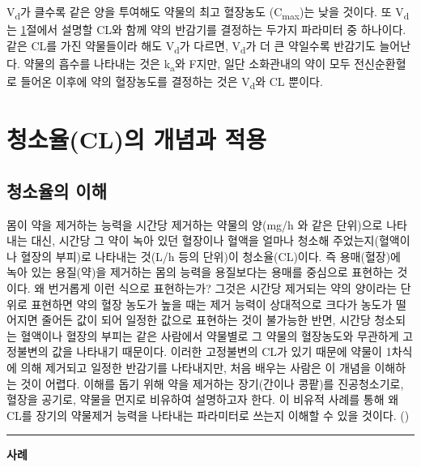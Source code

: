 \documentclass[
  11pt,
  krantz2, a4paper, twoside]{krantz}
\theoremstyle{definition}
\theoremstyle{definition}
\theoremstyle{definition}
\theoremstyle{definition}
\theoremstyle{remark}
\begin{document}
V\textsubscript{d}가 클수록 같은 양을 투여해도 약물의 최고 혈장농도 (C\textsubscript{max})는 낮을 것이다.
또 V\textsubscript{d}는 \ref{clearance-concept}절에서 설명할 CL와 함께 약의 반감기를 결정하는 두가지 파라미터 중 하나이다. 
같은 CL를 가진 약물들이라 해도 V\textsubscript{d}가 다르면, V\textsubscript{d}가 더 큰 약일수록 반감기도 늘어난다. 
약물의 흡수를 나타내는 것은 k\textsubscript{a}와 F지만, 일단 소화관내의 약이 모두 전신순환혈로 들어온 이후에 약의 혈장농도를 결정하는 것은 V\textsubscript{d}와 CL 뿐이다.

\section{청소율(CL)의 개념과 적용}\label{clearance-concept}

\subsection{\texorpdfstring{청소율의 이해}{청소율의 이해}}\label{uxccaduxc18cuxc728uxc758-uxc774uxd574}

몸이 약을 제거하는 능력을 시간당 제거하는 약물의 양(mg/h 와 같은 단위)으로 나타내는 대신, 시간당 그 약이 녹아 있던 혈장이나 혈액을 얼마나 청소해 주었는지(혈액이나 혈장의 부피)로 나타내는 것(L/h 등의 단위)이 청소율(CL)이다. 
즉 용매(혈장)에 녹아 있는 용질(약)을 제거하는 몸의 능력을 용질보다는 용매를 중심으로 표현하는 것이다.
왜 번거롭게 이런 식으로 표현하는가?
그것은 시간당 제거되는 약의 양이라는 단위로 표현하면 약의 혈장 농도가 높을 때는 제거 능력이 상대적으로 크다가 농도가 떨어지면 줄어든 값이 되어 일정한 값으로 표현하는 것이 불가능한 반면, 시간당 청소되는 혈액이나 혈장의 부피는 같은 사람에서 약물별로 그 약물의 혈장농도와 무관하게 고정불변의 값을 나타내기 때문이다.
이러한 고정불변의 CL가 있기 때문에 약물이 1차식에 의해 제거되고 일정한 반감기를 나타내지만, 처음 배우는 사람은 이 개념을 이해하는 것이 어렵다. 
이해를 돕기 위해 약을 제거하는 장기(간이나 콩팥)를 진공청소기로, 혈장을 공기로, 약물을 먼지로 비유하여 설명하고자 한다.
이 비유적 사례를 통해 왜 CL를 장기의 약물제거 능력을 나타내는 파라미터로 쓰는지 이해할 수 있을 것이다. ()

\begin{center}\rule{0.5\linewidth}{0.5pt}\end{center}

\textbf{사례}
\end{document}
